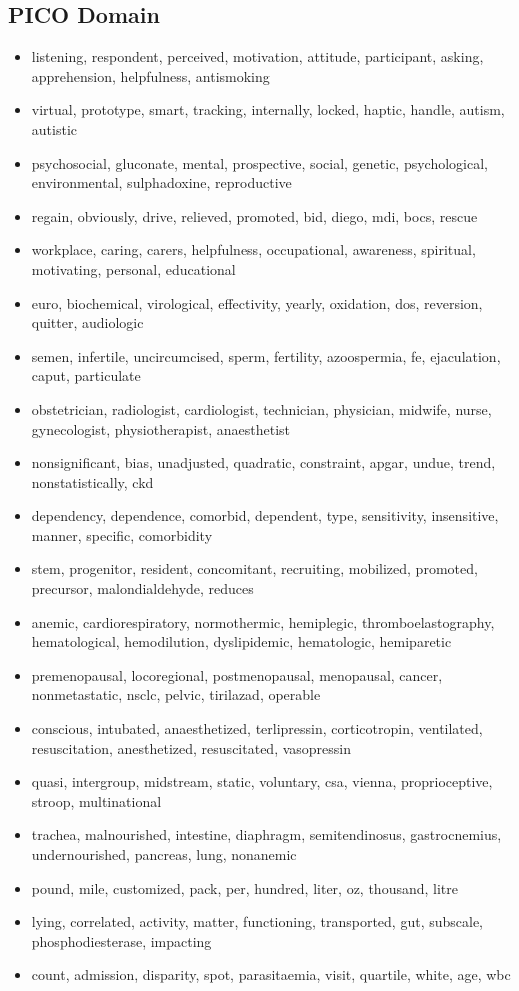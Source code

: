 \documentclass[11pt,a4paper]{article}
\begin{document}
\subsection{PICO Domain}
\begin{itemize}
\footnotesize
\item listening, respondent, perceived, motivation, attitude, participant, asking, apprehension, helpfulness, antismoking
\item virtual, prototype, smart, tracking, internally, locked, haptic, handle, autism, autistic 
\item psychosocial, gluconate, mental, prospective, social, genetic, psychological, environmental, sulphadoxine, reproductive 
\item regain, obviously, drive, relieved, promoted, bid, diego, mdi, bocs, rescue 
\item workplace, caring, carers, helpfulness, occupational, awareness, spiritual, motivating, personal, educational 
\item euro, biochemical, virological, effectivity, yearly, oxidation, dos, reversion, quitter, audiologic 
\item semen, infertile, uncircumcised, sperm, fertility, azoospermia, fe, ejaculation, caput, particulate
\item obstetrician, radiologist, cardiologist, technician, physician, midwife, nurse, gynecologist, physiotherapist, anaesthetist 
\item nonsignificant, bias, unadjusted, quadratic, constraint, apgar, undue, trend, nonstatistically, ckd 
\item dependency, dependence, comorbid, dependent, type, sensitivity, insensitive, manner, specific, comorbidity 
\item stem, progenitor, resident, concomitant, recruiting, mobilized, promoted, precursor, malondialdehyde, reduces 
\item anemic, cardiorespiratory, normothermic, hemiplegic, thromboelastography, hematological, hemodilution, dyslipidemic, hematologic, hemiparetic 
\item premenopausal, locoregional, postmenopausal, menopausal, cancer, nonmetastatic, nsclc, pelvic, tirilazad, operable 
\item conscious, intubated, anaesthetized, terlipressin, corticotropin, ventilated, resuscitation, anesthetized, resuscitated, vasopressin 
\item quasi, intergroup, midstream, static, voluntary, csa, vienna, proprioceptive, stroop, multinational 
\item trachea, malnourished, intestine, diaphragm, semitendinosus, gastrocnemius, undernourished, pancreas, lung, nonanemic 
\item pound, mile, customized, pack, per, hundred, liter, oz, thousand, litre 
\item lying, correlated, activity, matter, functioning, transported, gut, subscale, phosphodiesterase, impacting 
\item count, admission, disparity, spot, parasitaemia, visit, quartile, white, age, wbc 
\end{itemize}
\end{document}
